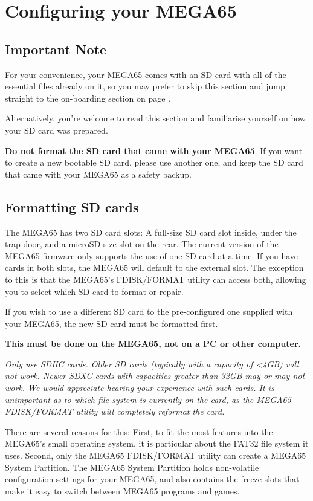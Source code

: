 \chapter{Configuring your MEGA65}
\label{cha:configuring}

\section{Important Note}

For your convenience, your MEGA65 comes with an SD card with all of the essential
files already on it, so you may prefer to skip this section and jump straight to
the on-boarding section on page \pageref{onboarding}.

Alternatively, you're welcome to read this section and familiarise
yourself on how your SD card was prepared.

{\bf Do not format the SD card that came with your MEGA65}.
If you want to create a new bootable SD card, please use another one,
and keep the SD card that came with your MEGA65 as a safety backup.

\section{Formatting SD cards}
The MEGA65 has two SD card slots: A full-size SD card slot inside, under
the trap-door, and a microSD size slot on the rear.  The current version
of the MEGA65 firmware only supports the use of one SD card at a time.
If you have cards in both slots, the MEGA65 will default to the external slot. The exception to this is that the MEGA65's FDISK/FORMAT
utility can access both, allowing you to select which SD card to format or
repair.

If you wish to use a different SD card to the pre-configured one supplied with your MEGA65, the new SD card must be formatted first.

{\bf This must be done on the MEGA65, not on a PC or other computer.}

{\em Only use SDHC cards. Older SD cards (typically with
  a capacity of <4GB) will not work. Newer SDXC cards with
  capacities greater than 32GB may or may not work. We would
  appreciate hearing your experience with such cards. It is unimportant
  as to which file-system is currently on the card, as the MEGA65
  FDISK/FORMAT utility will completely reformat the card.}

There are several reasons for this: First, to fit the most
features into the MEGA65's small operating system, it is
particular about the FAT32 file system it uses. Second, only the
MEGA65 FDISK/FORMAT utility can create a MEGA65 System Partition. The
MEGA65 System Partition holds non-volatile configuration settings for
your MEGA65, and also contains the freeze slots that make it easy to
switch between MEGA65 programs and games.

